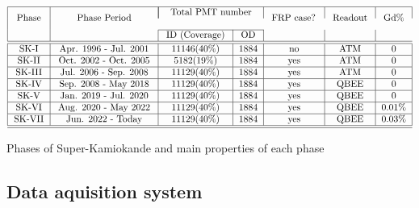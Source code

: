 \begin{table}[htp]
    $$
\begin{array}{|c|c|c|c|c|c|c|}
    
    \hline \multirow{2}{*}{\text { Phase }} & \multirow{2}{*}{\text { Phase Period }} & \multicolumn{2}{|c|}{\text { Total PMT number  }} & \multirow{2}{*}{\text { FRP case? }} & \multirow{2}{*}{\text { Readout }} & \multirow{2}{*}{\text { Gd\% }} \\
    \tabularnewline
    \cline {3-4} & &  \text { ID (Coverage) } & \text { OD } & & \tabularnewline
    \hline \hline \text { SK-I } & \text { Apr. 1996 - Jul. 2001 } & 11146(40 \%) & 1884 & \text { no } & \text { ATM } & 0 \\
    \hline \text { SK-II } & \text { Oct. 2002 - Oct. 2005 } & 5182(19 \%) & 1884 & \text { yes } & \text { ATM } & 0 \\
    \hline \text { SK-III } & \text { Jul. 2006 - Sep. 2008 } & 11129(40 \%) & 1884 & \text { yes } & \text { ATM } & 0 \\
    \hline \text { SK-IV } & \text { Sep. 2008 - May 2018 } & 11129(40 \%) & 1884 & \text { yes } & \text { QBEE } & 0 \\
    \hline \text {SK-V} & \text{ Jan. 2019 - Jul. 2020 }    &  11129(40 \%) & 1884 & \text { yes } & \text { QBEE } & 0 \\
    \hline \text {SK-VI} & \text{ Aug. 2020 - May 2022 }    &  11129(40 \%) & 1884 & \text { yes } & \text { QBEE } & 0.01\% \\
    \hline \text {SK-VII} & \text{ Jun. 2022 - Today }    &  11129(40 \%) & 1884 & \text { yes } & \text { QBEE } & 0.03\% \\
    \hline \hline 
\end{array}
    $$
\caption{Phases of Super-Kamiokande and main properties of each phase }
\label{table:phasetable}
\end{table}



\subsection{Data aquisition system}

